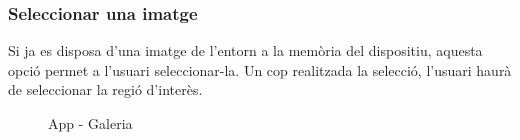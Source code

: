 	\subsubsection{Seleccionar una imatge}
	Si ja es disposa d'una imatge de l'entorn a la memòria del dispositiu, aquesta opció permet a l'usuari seleccionar-la. Un cop realitzada la selecció, l'usuari haurà de seleccionar la regió d'interès.
		\begin{figure}[H]
			\begin{minipage}{6in}
				\centering
				\hspace*{.2in}
			\end{minipage}
			\caption{App - Galeria}
		\end{figure}
